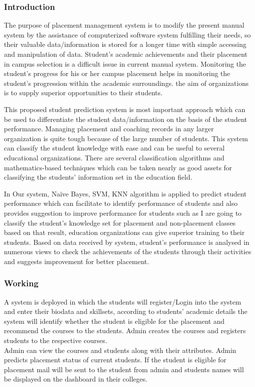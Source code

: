 \documentclass[12pt]{article}
\begin{document}
\subsubsection{Introduction}
The purpose of placement management system is to modify the present 
manual system by the assistance of computerized software 
system fulfilling their needs, so their valuable 
data/information is stored for a longer time with simple 
accessing and manipulation of data. Student’s academic 
achievements and their placement in campus selection is a 
difficult issue in current manual system. Monitoring the 
student’s progress for his or her campus placement helps in 
monitoring the student’s progression within the academic 
surroundings. the aim of organizations is to supply superior 
opportunities to their students. 

This proposed student prediction system is most important approach which can be 
used to differentiate the student data/information on the basis 
of the student performance. Managing placement and 
coaching records in any larger organization is quite tough 
because of the large number of students. This system can 
classify the student knowledge with ease and can be useful to 
several educational organizations. There are several 
classification algorithms and mathematics-based techniques 
which can be taken nearly as good assets for classifying the 
students’ information set in the education field. 

In Our system, Naïve Bayes, SVM, KNN algorithm is applied to predict 
student performance which can facilitate to identify 
performance of students and also provides suggestion to 
improve performance for students such as I are going to 
classify the student's knowledge set for placement and non-placement classes based on that result, education 
organizations can give superior training to their students. 
Based on data received by system, student’s performance is 
analysed in numerous views to check the achievements of the 
students through their activities and suggests improvement for 
better placement.

\newpage
\subsubsection{Working}

A system is deployed in which the 
students will register/Login into the system and enter their 
biodata and skillsets, according to students’ academic details 
the system will identify whether the student is eligible for the 
placement and recommend the courses to the students. Admin 
creates the courses and registers students to the respective 
courses. 
\\
Admin can view the courses and students along with 
their attributes. Admin predicts placement status of current 
students. If the student is eligible for placement mail will be 
sent to the student from admin and students names will be 
displayed on the dashboard in their colleges.
\end{document}
